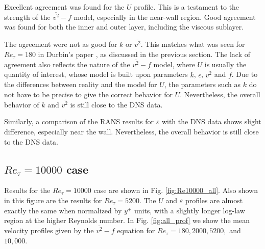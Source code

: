 \documentclass[a4paper,11pt]{article}
\begin{document}
Excellent agreement was found for the $U$ profile.  This is a testament to the strength of the $\overline{v^2}-f$ model, especially in the near-wall region.  Good agreement was found for both the inner and outer layer, including the viscous sublayer.

The agreement were not as good for $k$ or $\overline{v^2}$.  This matches what was seen for $Re_{\tau} = 180$ in Durbin's paper \cite{durbin180}, as discussed in the previous section.  The lack of agreement also reflects the nature of the $\overline{v^2}-f$ model, where $U$ is usually the quantity of interest, whose model is built upon parameters $k$, $\epsilon$, $\overline{v^2}$ and $f$.  Due to the differences between reality and the model for $U$, the parameters such as $k$ do not have to be precise to give the correct behavior for $U$. Nevertheless, the overall behavior of $k$ and $\overline{v^2}$ is still close to the DNS data.

Similarly, a comparison of the RANS results for $\varepsilon$ with the DNS data shows slight difference, especially near the wall. Nevertheless, the overall behavior is still close to the DNS data.

\subsection{$Re_{\tau} = 10000$ case}

Results for the $Re_{\tau} = 10000$ case are shown in Fig.
\ref{fig:Re10000_all}.  Also shown in this figure are the results for $Re_{\tau}
= 5200$.  The $U$ and $\varepsilon$ profiles are almost exactly the same when
normalized by $y^+$ units, with a slightly longer log-law region at the higher
Reynolds number. In Fig. \ref{fig:all_prof} we show the mean velocity profiles
given by the $\overline{v^2}-f$ equation for $Re_\tau = 180, 2000, 5200,$ and
$10,000$. 
\end{document}
